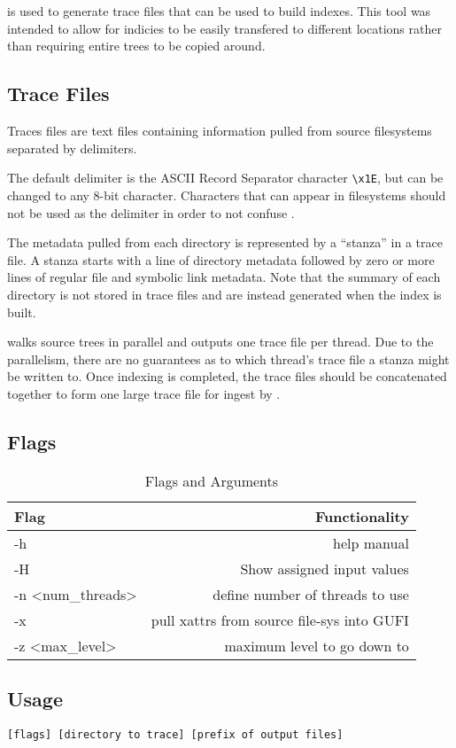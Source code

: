\section{\gufidirtrace}
\gufidirtrace is used to generate trace files that can be used to
build indexes. This tool was intended to allow for indicies to be
easily transfered to different locations rather than requiring entire
trees to be copied around.

\subsection{Trace Files}
Traces files are text files containing \lstat information pulled from
source filesystems separated by delimiters.

The default delimiter is the ASCII Record Separator character
\texttt{\textbackslash x1E}, but can be changed to any 8-bit
character. Characters that can appear in filesystems should not be
used as the delimiter in order to not confuse \gufitraceindex.

The metadata pulled from each directory is represented by a ``stanza''
in a trace file. A stanza starts with a line of directory metadata
followed by zero or more lines of regular file and symbolic link
metadata. Note that the summary of each directory is not stored in
trace files and are instead generated when the index is built.

\gufidirtrace walks source trees in parallel and outputs one trace
file per thread. Due to the parallelism, there are no guarantees as to
which thread's trace file a stanza might be written to. Once indexing
is completed, the trace files should be concatenated together to form
one large trace file for ingest by \gufitraceindex.

\subsection{Flags}
\begin{table} [h]
  \centering
  \begin{tabular}{l|r}
    Flag & Functionality \\\hline
    -h & help manual \\
    -H & Show assigned input values \\
    -n \textless num\_threads\textgreater  & define number of threads to use \\
    -x & pull xattrs from source file-sys into GUFI \\
    -z \textless max\_level\textgreater & maximum level to go down to
  \end{tabular}
  \caption{\label{fig:Flags_for_dir2trace} \gufidirtrace Flags and Arguments}
\end{table}

\subsection{Usage}
\gufidirtrace \texttt{[flags] [directory to trace] [prefix of output files]}

